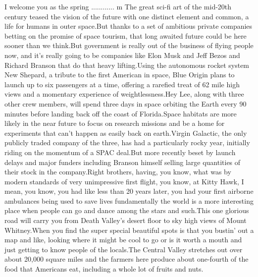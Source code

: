 \documentclass{article}%
\begin{document}
I welcome you as the spring ............ m The great sci{-}fi art of the mid{-}20th century teased the vision of the future with one distinct element and common, a life for humans in outer space.But thanks to a set of ambitious private companies betting on the promise of space tourism, that long awaited future could be here sooner than we think.But government is really out of the business of flying people now, and it's really going to be companies like Elon Musk and Jeff Bezos and Richard Branson that do that heavy lifting.Using the autonomous rocket system New Shepard, a tribute to the first American in space, Blue Origin plans to launch up to six passengers at a time, offering a rarefied treat of 62 mile high views and a momentary experience of weightlessness.Hey Lee, along with three other crew members, will spend three days in space orbiting the Earth every 90 minutes before landing back off the coast of Florida.Space habitats are more likely in the near future to focus on research missions and be a home for experiments that can't happen as easily back on earth.Virgin Galactic, the only publicly traded company of the three, has had a particularly rocky year, initially riding on the momentum of a SPAC deal.But more recently beset by launch delays and major funders including Branson himself selling large quantities of their stock in the company.Right brothers, having, you know, what was by modern standards of very unimpressive first flight, you know, at Kitty Hawk, I mean, you know, you had like less than 20 years later, you had your first airborne ambulances being used to save lives fundamentally the world is a more interesting place when people can go and dance among the stars and such.This one glorious road will carry you from Death Valley's desert floor to sky high views of Mount Whitney.When you find the super special beautiful spots is that you bustin' out a map and like, looking where it might be cool to go or is it worth a mouth and just getting to know people of the locals.The Central Valley stretches out over about 20,000 square miles and the farmers here produce about one{-}fourth of the food that Americans eat, including a whole lot of fruits and nuts.%
\end{document}
